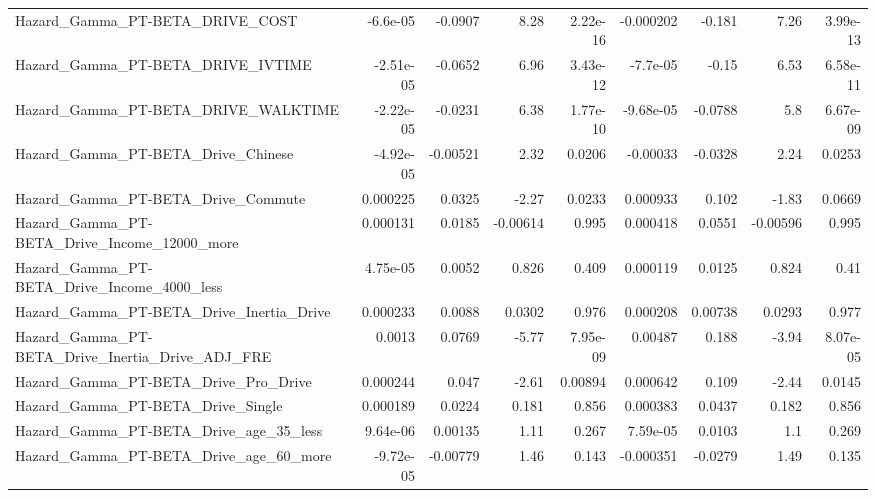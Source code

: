 \begin{tabular}{lrrrrrrrr}
Hazard\_Gamma\_PT-BETA\_DRIVE\_COST                    &    -6.6e-05 &      -0.0907 &     8.28 & 2.22e-16 &  -0.000202 &      -0.181 &         7.26 &      3.99e-13 \\
Hazard\_Gamma\_PT-BETA\_DRIVE\_IVTIME                  &   -2.51e-05 &      -0.0652 &     6.96 & 3.43e-12 &   -7.7e-05 &       -0.15 &         6.53 &      6.58e-11 \\
Hazard\_Gamma\_PT-BETA\_DRIVE\_WALKTIME                &   -2.22e-05 &      -0.0231 &     6.38 & 1.77e-10 &  -9.68e-05 &     -0.0788 &          5.8 &      6.67e-09 \\
Hazard\_Gamma\_PT-BETA\_Drive\_Chinese                 &   -4.92e-05 &     -0.00521 &     2.32 &   0.0206 &   -0.00033 &     -0.0328 &         2.24 &        0.0253 \\
Hazard\_Gamma\_PT-BETA\_Drive\_Commute                 &    0.000225 &       0.0325 &    -2.27 &   0.0233 &   0.000933 &       0.102 &        -1.83 &        0.0669 \\
Hazard\_Gamma\_PT-BETA\_Drive\_Income\_12000\_more       &    0.000131 &       0.0185 & -0.00614 &    0.995 &   0.000418 &      0.0551 &     -0.00596 &         0.995 \\
Hazard\_Gamma\_PT-BETA\_Drive\_Income\_4000\_less        &    4.75e-05 &       0.0052 &    0.826 &    0.409 &   0.000119 &      0.0125 &        0.824 &          0.41 \\
Hazard\_Gamma\_PT-BETA\_Drive\_Inertia\_Drive           &    0.000233 &       0.0088 &   0.0302 &    0.976 &   0.000208 &     0.00738 &       0.0293 &         0.977 \\
Hazard\_Gamma\_PT-BETA\_Drive\_Inertia\_Drive\_ADJ\_FRE   &      0.0013 &       0.0769 &    -5.77 & 7.95e-09 &    0.00487 &       0.188 &        -3.94 &      8.07e-05 \\
Hazard\_Gamma\_PT-BETA\_Drive\_Pro\_Drive               &    0.000244 &        0.047 &    -2.61 &  0.00894 &   0.000642 &       0.109 &        -2.44 &        0.0145 \\
Hazard\_Gamma\_PT-BETA\_Drive\_Single                  &    0.000189 &       0.0224 &    0.181 &    0.856 &   0.000383 &      0.0437 &        0.182 &         0.856 \\
Hazard\_Gamma\_PT-BETA\_Drive\_age\_35\_less             &    9.64e-06 &      0.00135 &     1.11 &    0.267 &   7.59e-05 &      0.0103 &          1.1 &         0.269 \\
Hazard\_Gamma\_PT-BETA\_Drive\_age\_60\_more             &   -9.72e-05 &     -0.00779 &     1.46 &    0.143 &  -0.000351 &     -0.0279 &         1.49 &         0.135 \\

\end{tabular}
